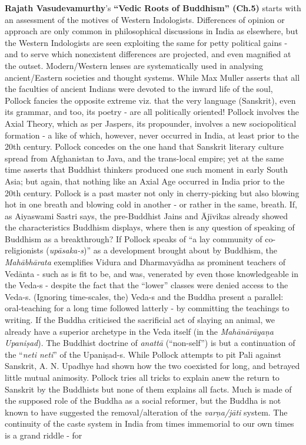 \textbf{Rajath Vasudevamurthy}’s \textbf{“Vedic Roots of Buddhism” (Ch.5)} starts with an assessment of the motives of Western Indologists. Differences of opinion or approach are only common in philosophical discussions in India as elsewhere, but the Western Indologists are seen exploiting the same for petty political gains - and to serve which nonexistent differences are projected, and even magnified at the outset. Modern/Western lenses are systematically used in analysing ancient/Eastern societies and thought systems. While Max Muller asserts that all the faculties of ancient Indians were devoted to the inward life of the soul, Pollock fancies the opposite extreme viz. that the very language (Sanskrit), even its grammar, and too, its poetry - are all politically oriented! Pollock involves the Axial Theory, which as per Jaspers, its propounder, involves a new sociopolitical formation - a like of which, however, never occurred in India, at least prior to the 20th century. Pollock concedes on the one hand that Sanskrit literary culture spread from Afghanistan to Java, and the trans-local empire; yet at the same time asserts that Buddhist thinkers produced one such moment in early South Asia; but again, that nothing like an Axial Age occurred in India prior to the 20th century. Pollock is a past master not only in cherry-picking but also blowing hot in one breath and blowing cold in another - or rather in the same, breath. If, as Aiyaswami Sastri says, the pre-Buddhist Jains and Ājīvikas already showed the characteristics Buddhism displays, where then is any question of speaking of Buddhism as a breakthrough? If Pollock speaks of “a lay community of co-religionists (\textit{upāsaka-s})” as a development brought about by Buddhism, the \textit{Mahābhārata} exemplifies Vidura and Dharmavyādha as prominent teachers of Vedānta - such as is fit to be, and was, venerated by even those knowledgeable in the Veda-s - despite the fact that the “lower” classes were denied access to the Veda-s. (Ignoring time-scales, the) Veda-s and the Buddha present a parallel: oral-teaching for a long time followed latterly - by committing the teachings to writing. If the Buddha criticised the sacrificial act of slaying an animal, we already have a superior archetype in the Veda itself (in the \textit{Mahānārāyaṇa Upaniṣad}). The Buddhist doctrine of \textit{anattā} (“non-self”) is but a continuation of the “\textit{neti neti}” of the Upaniṣad-s. While Pollock attempts to pit Pali against Sanskrit, A. N. Upadhye had shown how the two coexisted for long, and betrayed little mutual animosity. Pollock tries all tricks to explain anew the return to Sanskrit by the Buddhists but none of them explains all facts. Much is made of the supposed role of the Buddha as a social reformer, but the Buddha is not known to have suggested the removal/alteration of the \textit{varṇa/jāti} system. The continuity of the caste system in India from times immemorial to our own times is a grand riddle - for 